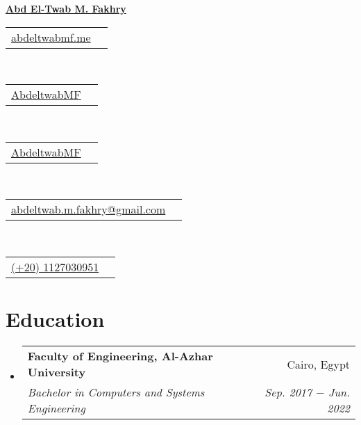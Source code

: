 \documentclass[letterpaper, 11pt]{article}
\makeatletter
\newcommand{\education}[5] {
  \vspace{-1pt}\item
  \begin{tabular*}{0.97\textwidth}[t]{l@{\extracolsep{\fill}}r}
    #1 \textbf{#2} & #3 \\
    \textit{\small #4} & \textit{\small #5} \\
  \end{tabular*}
  \vspace{-4pt}
}
\newcommand{\name}[2] {
  \textbf{
    \href{#1}{\Huge{#2}}
  }
  \vspace{-8pt}
}
\newcommand{\contact}[4] {
  \begin{tabular}{lr}
    {\href{#1}{\color{#3} #2 #4}}
  \end{tabular}
  \vspace{-4pt}
}
\makeatother
\begin{document}
\name{http://abdeltwabmf.me}{Abd El-Twab M. Fakhry}

\begin{center}
  \small
  \contact
  {https://abdeltwabmf.github.io}
  {\faIcon{globe}}
  {RoyalBlue}
  {abdeltwabmf.me}\,
  \contact
  {https://www.linkedin.com/in/abdeltwabmf}
  {\faIcon{linkedin}}
  {RoyalBlue}
  {AbdeltwabMF}\,
  \contact
  {https://github.com/AbdeltwabMF}
  {\faIcon{github}}
  {RoyalBlue}
  {AbdeltwabMF}\,
  \contact
  {mailto:abdeltwab.m.fakhry@gmail.com}
  {\faIcon{envelope}}
  {RoyalBlue}
  {abdeltwab.m.fakhry@gmail.com}\,
  \contact
  {tel:+201127030951}
  {\faIcon{mobile-alt}}
  {RoyalBlue}
  {(+20) 1127030951}
\end{center}\vspace{8pt}

\section{Education}
\begin{itemize}[leftmargin=*]
  \education
  {\faIcon{university}}
  {Faculty of Engineering, Al-Azhar University}{ Cairo, Egypt}
  {Bachelor in Computers and Systems Engineering}{ Sep. 2017 $-$ Jun. 2022}
\end{itemize}

\end{document}
